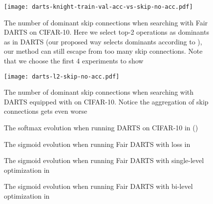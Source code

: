 \documentclass[runningheads]{llncs}
\begin{document}
\begin{figure}[ht]
	\centering
	\texttt{[image: darts-knight-train-val-acc-vs-skip-no-acc.pdf]}
\caption{The number of dominant skip connections when searching with Fair DARTS on CIFAR-10. Here we select top-2 operations as dominants as in DARTS (our proposed way selects dominants according to ), our method can still escape from too many skip connections. Note that we choose the first 4 experiments to show}
	\label{fig:num-skip-cifar-fair-darts}
\end{figure}

\begin{figure}[ht]
	\centering
	\texttt{[image: darts-l2-skip-no-acc.pdf]}
\caption{The number of dominant skip connections when searching with DARTS equipped with  on CIFAR-10. Notice the aggregation of skip connections gets even worse}
	\label{fig:darts-l2-skip-no-acc}
\end{figure}




\begin{figure*}[ht]
	\centering
	\caption{The softmax evolution when running DARTS on CIFAR-10 in  ()}
	\label{fig:darts-softmax-all-s1}
\end{figure*}


\begin{figure*}[ht]
	\centering
	\caption{The sigmoid evolution when running Fair DARTS with  loss in }
	\label{fig:l1-alpha}
\end{figure*}

\begin{figure*}[ht]
	\centering
	\caption{The sigmoid evolution when running Fair DARTS with single-level optimization in }
	\label{fig:single-alpha}
\end{figure*}

\begin{figure*}[ht]
	\centering
	\caption{The sigmoid evolution when running Fair DARTS with bi-level optimization in }
	\label{fig:bilevel-alpha}
\end{figure*}
\end{document}

